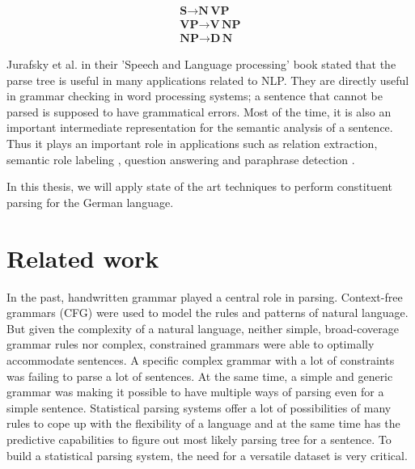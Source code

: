 \documentclass[a4paper, 11pt]{article}
\begin{document}
\begin{align*}
\textbf{S} \rightarrow \textbf{N} \, \textbf{VP} \\
\textbf{VP} \rightarrow \textbf{V} \, \textbf{NP} \\
\textbf{NP} \rightarrow \textbf{D} \, \textbf{N} 
\end{align*}

Jurafsky et al. \parencite{Jurafsky2008} in their 'Speech and Language processing' book stated that the parse tree is useful in many applications related to NLP. They are directly useful in grammar checking in word processing systems; a sentence that cannot be parsed is supposed to have grammatical errors. Most of the time, it is also an important intermediate representation for the semantic analysis of a sentence. Thus it plays an important role in applications such as relation extraction, semantic role labeling \parencite{Gildea:2002:NPP:1073083.1073124}, question answering and paraphrase detection \parencite{Callison-Burch2010}.


In this thesis, we will apply state of the art techniques to perform constituent parsing for the German language.


\pagebreak
\section{Related work}

In the past, handwritten grammar played a central role in parsing. Context-free grammars (CFG) were used to model the rules and patterns of natural language. But given the complexity of a natural language, neither simple, broad-coverage grammar rules nor complex, constrained grammars were able to optimally accommodate sentences. A specific complex grammar with a lot of constraints was failing to parse a lot of sentences. At the same time, a simple and generic grammar was making it possible to have multiple ways of parsing even for a simple sentence. Statistical parsing systems offer a lot of possibilities of many rules to cope up with the flexibility of a language and at the same time has the predictive capabilities to figure out most likely parsing tree for a sentence. To build a statistical parsing system, the need for a versatile dataset is very critical. 
\end{document}
